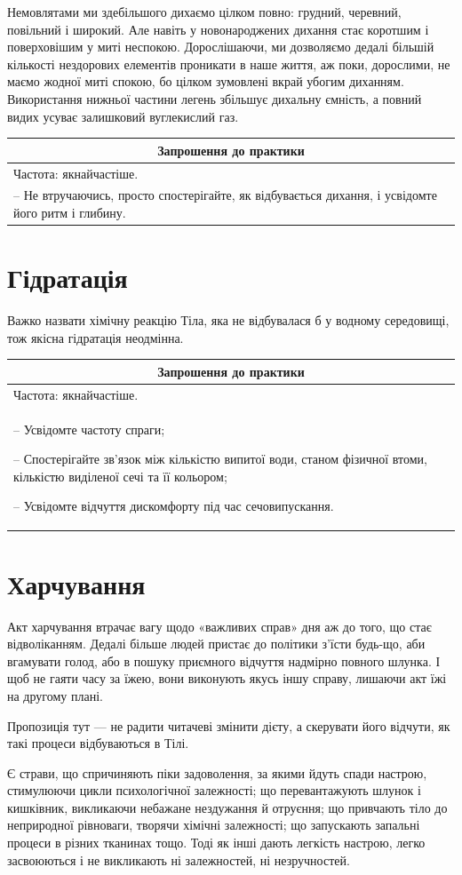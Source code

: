 \documentclass[oneside, 12pt]{book}
\newenvironment{prat}[1]
{\begin{center}
\begin{tabular}{p{0.9\textwidth}}
\hline\hline
\multicolumn{1}{c}{Запрошення до практики}\\
\hline
Частота: #1.\\
\hline
}{\\
\hline\hline
\end{tabular} 
\end{center}}
\begin{document}
Немовлятами ми здебільшого дихаємо цілком повно: грудний, черевний, повільний і широкий. Але навіть у новонароджених дихання стає коротшим і поверховішим у миті неспокою. Дорослішаючи, ми дозволяємо дедалі більшій кількості нездорових елементів проникати в наше життя, аж поки, дорослими, не маємо жодної миті спокою, бо цілком зумовлені вкрай убогим диханням. Використання нижньої частини легень збільшує дихальну ємність, а повний видих усуває залишковий вуглекислий газ.

\begin{prat}{якнайчастіше}
-- Не втручаючись, просто спостерігайте, як відбувається дихання, і усвідомте його ритм і глибину.
\end{prat}

\section*{Гідратація}

Важко назвати хімічну реакцію Тіла, яка не відбувалася б у водному середовищі, тож якісна гідратація неодмінна.

\begin{prat}{якнайчастіше}
-- Усвідомте частоту спраги;

-- Спостерігайте зв'язок між кількістю випитої води, станом фізичної втоми, кількістю виділеної сечі та її кольором;

-- Усвідомте відчуття дискомфорту під час сечовипускання.
\end{prat}

\section*{Харчування}

Акт харчування втрачає вагу щодо «важливих справ» дня аж до того, що стає відволіканням. Дедалі більше людей пристає до політики з'їсти будь-що, аби вгамувати голод, або в пошуку приємного відчуття надмірно повного шлунка. І щоб не гаяти часу за їжею, вони виконують якусь іншу справу, лишаючи акт їжі на другому плані.

Пропозиція тут --- не радити читачеві змінити дієту, а скерувати його відчути, як такі процеси відбуваються в Тілі.

Є страви, що спричиняють піки задоволення, за якими йдуть спади настрою, стимулюючи цикли психологічної залежності; що перевантажують шлунок і кишківник, викликаючи небажане нездужання й отруєння; що привчають тіло до неприродної рівноваги, творячи хімічні залежності; що запускають запальні процеси в різних тканинах тощо. Тоді як інші дають легкість настрою, легко засвоюються і не викликають ні залежностей, ні незручностей.
\end{document}
